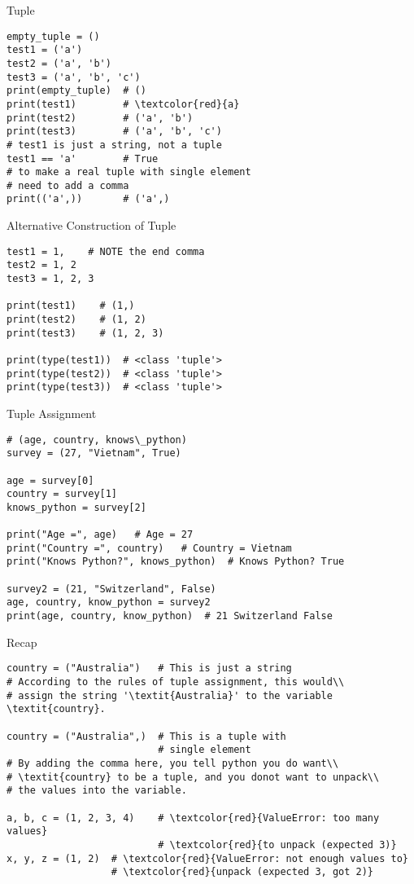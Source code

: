 \documentclass{beamer}
\begin{document}
\begin{frame}[fragile]{Tuple}
\begin{verbatim}
empty_tuple = ()
test1 = ('a')
test2 = ('a', 'b')
test3 = ('a', 'b', 'c')
print(empty_tuple)  # ()
print(test1)        # \textcolor{red}{a}
print(test2)        # ('a', 'b')
print(test3)        # ('a', 'b', 'c')
# test1 is just a string, not a tuple
test1 == 'a'        # True
# to make a real tuple with single element
# need to add a comma
print(('a',))       # ('a',)
\end{verbatim}
\end{frame}

\begin{frame}[fragile]{Alternative Construction of Tuple}
\begin{verbatim}
test1 = 1,    # NOTE the end comma
test2 = 1, 2
test3 = 1, 2, 3

print(test1)    # (1,)
print(test2)    # (1, 2)
print(test3)    # (1, 2, 3)

print(type(test1))  # <class 'tuple'> 
print(type(test2))  # <class 'tuple'>
print(type(test3))  # <class 'tuple'>
\end{verbatim}
\end{frame}

\begin{frame}[fragile]{Tuple Assignment}
\begin{verbatim}
# (age, country, knows\_python)
survey = (27, "Vietnam", True)

age = survey[0]
country = survey[1]
knows_python = survey[2]

print("Age =", age)   # Age = 27
print("Country =", country)   # Country = Vietnam
print("Knows Python?", knows_python)  # Knows Python? True

survey2 = (21, "Switzerland", False)
age, country, know_python = survey2
print(age, country, know_python)  # 21 Switzerland False
\end{verbatim}
\end{frame}

\begin{frame}[fragile]{Recap}
\begin{verbatim}
country = ("Australia")   # This is just a string
# According to the rules of tuple assignment, this would\\
# assign the string '\textit{Australia}' to the variable \textit{country}.

country = ("Australia",)  # This is a tuple with 
                          # single element
# By adding the comma here, you tell python you do want\\
# \textit{country} to be a tuple, and you donot want to unpack\\
# the values into the variable.

a, b, c = (1, 2, 3, 4)    # \textcolor{red}{ValueError: too many values}
                          # \textcolor{red}{to unpack (expected 3)}
x, y, z = (1, 2)  # \textcolor{red}{ValueError: not enough values to}
                  # \textcolor{red}{unpack (expected 3, got 2)}
\end{verbatim}
\end{frame}
\end{document}
